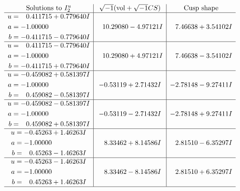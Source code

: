 \documentclass[1p]{elsarticle_modified}
\theoremstyle{definition}
\newcommand{\I}{\sqrt{-1}}
\begin{document}
$$\begin{array}{c|c|c}  
\text{Solutions to }I^u_{2}& \I (\text{vol} + \sqrt{-1}CS) & \text{Cusp shape}\\
 \hline 
\begin{aligned}
u &= \phantom{-}0.411715 + 0.779640 I \\
a &= -1.00000\phantom{ +0.000000I} \\
b &= -0.411715 - 0.779640 I\end{aligned}
 & \phantom{-}10.29080 - 4.97121 I & \phantom{-}7.46638 + 3.54102 I \\ \hline\begin{aligned}
u &= \phantom{-}0.411715 - 0.779640 I \\
a &= -1.00000\phantom{ +0.000000I} \\
b &= -0.411715 + 0.779640 I\end{aligned}
 & \phantom{-}10.29080 + 4.97121 I & \phantom{-}7.46638 - 3.54102 I \\ \hline\begin{aligned}
u &= -0.459082 + 0.581397 I \\
a &= -1.00000\phantom{ +0.000000I} \\
b &= \phantom{-}0.459082 - 0.581397 I\end{aligned}
 & -0.53119 + 2.71432 I & -2.78148 - 9.27411 I \\ \hline\begin{aligned}
u &= -0.459082 - 0.581397 I \\
a &= -1.00000\phantom{ +0.000000I} \\
b &= \phantom{-}0.459082 + 0.581397 I\end{aligned}
 & -0.53119 - 2.71432 I & -2.78148 + 9.27411 I \\ \hline\begin{aligned}
u &= -0.45263 + 1.46263 I \\
a &= -1.00000\phantom{ +0.000000I} \\
b &= \phantom{-}0.45263 - 1.46263 I\end{aligned}
 & \phantom{-}8.33462 + 8.14586 I & \phantom{-}2.81510 - 6.35297 I \\ \hline\begin{aligned}
u &= -0.45263 - 1.46263 I \\
a &= -1.00000\phantom{ +0.000000I} \\
b &= \phantom{-}0.45263 + 1.46263 I\end{aligned}
 & \phantom{-}8.33462 - 8.14586 I & \phantom{-}2.81510 + 6.35297 I\\
 \hline 
 \end{array}$$\newpage\newpage\renewcommand{\arraystretch}{1}
\end{document}
